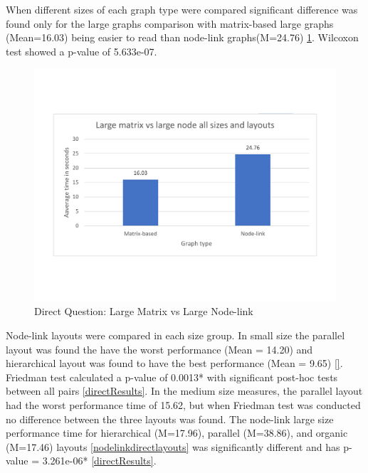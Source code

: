 \documentclass{l4proj}
\begin{document}
When different sizes of each graph type were compared significant difference was found only for the large graphs comparison with matrix-based large graphs (Mean=16.03) being easier to read than node-link graphs(M=24.76) \ref{largenodevsmartrixdirect}. Wilcoxon test showed a p-value of 5.633e-07. 

\begin{figure}[H]
\centering
\includegraphics[width=15cm]{largenodevsmartrixdirect.pdf}
\caption{Direct Question: Large Matrix vs Large Node-link}
\label{largenodevsmartrixdirect}
\end{figure}

Node-link layouts were compared in each size group. In small size the parallel layout was found the have the worst performance (Mean = 14.20) and hierarchical layout was found to have the best performance (Mean = 9.65) \ref{}. Friedman test calculated a p-value of 0.0013* with significant post-hoc tests between all pairs \ref{directResults}. In the medium size measures, the parallel layout had the worst performance time of 15.62, but when Friedman test was conducted no difference between the three layouts was found. The node-link large size performance time for hierarchical (M=17.96), parallel (M=38.86), and organic (M=17.46) layouts \ref{nodelinkdirectlayouts} was significantly different and has p-value = 3.261e-06* \ref{directResults}. 
\end{document}
